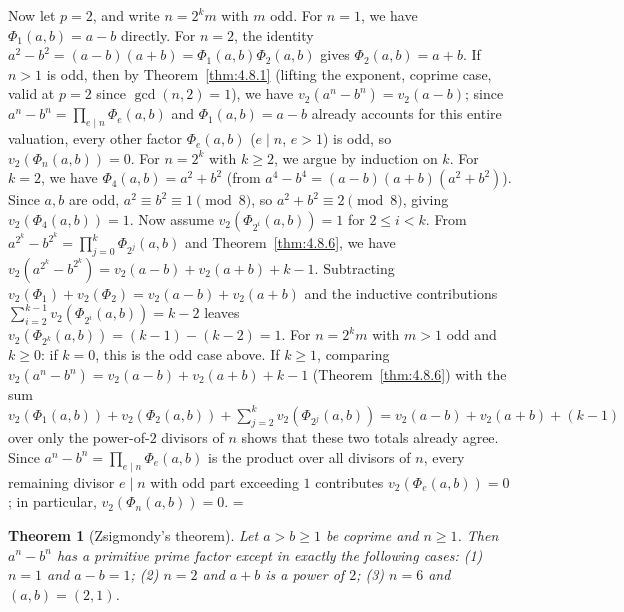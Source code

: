\documentclass[11pt]{article}
\makeatletter
\let\nt@closedisplay\]
\def\nt@guardedclose{\@ifnextchar\par{\nt@closeafterpar}{\@ifnextchar\end{\postdisplaypenalty\@M\nt@closedisplay}{\nt@closedisplay}}}
\def\nt@closeafterpar\par{\@ifnextchar\par{\nt@closeafterpar}{\@ifnextchar\end{\postdisplaypenalty\@M\nt@closedisplay\par}{\nt@closedisplay\par}}}
\renewenvironment{proof}[1][\proofname]{\par
  \pushQED{\qed}\normalfont\topsep\medskipamount\edef\nt@afterproof{\@endparpenalty=\the\@endparpenalty\relax}\@beginparpenalty\@M\@endparpenalty\@M\let\]\nt@guardedclose\trivlist\item[]\textit{#1\@addpunct{.}} \ignorespaces}{\ifvmode\addpenalty\@M\fi\popQED\nt@afterproof\endtrivlist\@endpefalse}
\theoremstyle{ntstyle}
\newtheorem{theorem}{Theorem}[subsection]
\makeatother
\begin{document}
\begin{proof}
  Now let $p=2$, and write $n=2^km$ with $m$ odd.
  For $n=1$, we have $\Phi_1(a,b)=a-b$ directly. For $n=2$, the identity
  $a^{2}-b^{2}=(a-b)(a+b)=\Phi_1(a,b)\Phi_2(a,b)$ gives $\Phi_2(a,b)=a+b$.
  If $n>1$ is odd, then by Theorem~\ref{thm:4.8.1} (lifting the exponent, coprime case, valid at $p=2$
  since $\gcd(n, 2)=1$), we have $v_2(a^{n}-b^{n})=v_2(a-b)$; since
  $a^{n}-b^{n}=\prod_{e\mid n}\Phi_e(a,b)$ and $\Phi_1(a,b)=a-b$
  already accounts for this entire valuation, every other factor
  $\Phi_e(a,b)$ ($e\mid n$, $e>1$) is odd, so $v_2(\Phi_n(a,b))=0$. For $n=2^k$ with $k\ge2$, we argue by induction
  on $k$. For $k=2$, we have $\Phi_4(a,b)=a^{2}+b^{2}$ (from $a^{4}-b^{4}=(a-b)(a+b)(a^{2}+b^{2})$). Since $a,b$
  are odd, $a^{2}\equiv b^{2}\equiv1\pmod{8}$, so $a^{2}+b^{2}\equiv2\pmod{8}$, giving $v_2(\Phi_4(a,b))=1$. Now
  assume $v_2(\Phi_{2^{i}}(a,b))=1$ for $2\le i<k$. From $a^{2^{k}}-b^{2^{k}}=\prod_{j=0}^{k}\Phi_{2^{j}}(a,b)$ and
  Theorem~\ref{thm:4.8.6}, we have $v_2(a^{2^{k}}-b^{2^{k}})=v_2(a-b)+v_2(a+b)+k-1$. Subtracting
  $v_2(\Phi_1)+v_2(\Phi_2)=v_2(a-b)+v_2(a+b)$ and the inductive contributions
  $\sum_{i=2}^{k-1}v_2(\Phi_{2^{i}}(a,b))=k-2$ leaves $v_2(\Phi_{2^{k}}(a,b))=(k-1)-(k-2)=1$. For $n=2^{k}m$ with
  $m>1$ odd and $k\ge0$: if $k=0$, this is the odd case above. If $k\ge1$, comparing
  $v_2(a^{n}-b^{n})=v_2(a-b)+v_2(a+b)+k-1$ (Theorem~\ref{thm:4.8.6}) with the sum
  $v_2(\Phi_1(a,b))+v_2(\Phi_2(a,b))+\sum_{j=2}^{k}v_2(\Phi_{2^{j}}(a,b))=v_2(a-b)+v_2(a+b)+(k-1)$ over only the
  power-of-$2$ divisors of $n$ shows that these two totals already agree. Since
  $a^{n}-b^{n}=\prod_{e\mid n}\Phi_e(a,b)$ is the product over all divisors of $n$, every remaining divisor
  $e\mid n$ with odd part exceeding $1$ contributes $v_2(\Phi_e(a,b))=0$; in particular, $v_2(\Phi_n(a,b))=0$.
\end{proof}

\begin{theorem}[Zsigmondy's theorem]\label{thm:6.11.9}\label{thm:zsigmondy-theorem}
  Let $a > b \ge 1$ be
  coprime and $n \ge 1$. Then $a^{n} - b^{n}$ has a primitive prime
  factor except in exactly the following cases: (1) $n = 1$ and $a - b = 1$; (2) $n = 2$
  and $a + b$ is a power of $2$; (3) $n = 6$ and $(a, b) = (2, 1)$.

\end{theorem}
\end{document}
